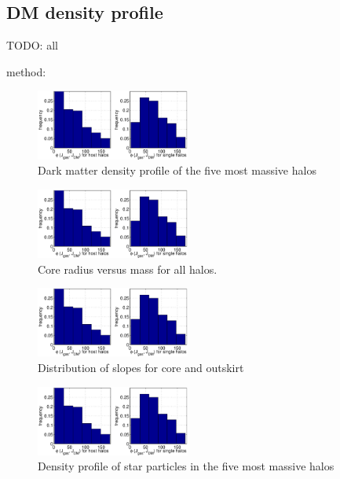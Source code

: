 \documentclass[useAMS,usenatbib]{mn2e}
\begin{document}
\subsection{DM density profile}

TODO: all

method:

\begin{figure}
  \begin{center}
    \includegraphics[width=0.45\textwidth]{fig/a.eps}%
  \end{center}
  \caption{\label{fig:dm_prof}Dark matter density profile of the five most massive halos}
\end{figure}

\begin{figure}
  \begin{center}
    \includegraphics[width=0.45\textwidth]{fig/a.eps}%
  \end{center}
  \caption{\label{fig:r_core_m}Core radius versus mass for all halos.}
\end{figure}

\begin{figure}
  \begin{center}
    \includegraphics[width=0.45\textwidth]{fig/a.eps}%
  \end{center}
  \caption{\label{fig:hist_slopes}Distribution of slopes for core and outskirt}
\end{figure}

\begin{figure}
  \begin{center}
    \includegraphics[width=0.45\textwidth]{fig/a.eps}%
  \end{center}
  \caption{\label{fig:star_prof}Density profile of star particles in the five most massive halos}
\end{figure}
\end{document}
